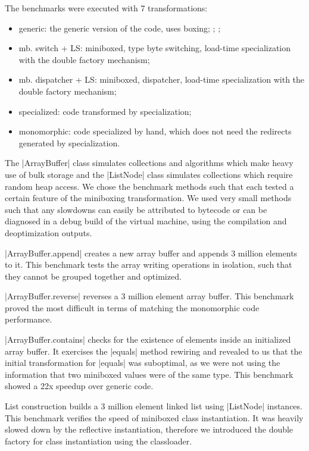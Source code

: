 The benchmarks were executed with 7 transformations:
\begin{itemize}
\item {generic}: the generic version of the code, uses boxing;
;
;
\item {mb. switch + LS}: miniboxed, type byte switching, load-time specialization with the double factory mechanism; 
\item {mb. dispatcher + LS}: miniboxed, dispatcher, load-time specialization with the double factory mechanism;
\item {specialized}: code transformed by specialization;
\item {monomorphic}: code specialized by hand, which does not need the redirects generated by specialization.
\end{itemize}


 The |ArrayBuffer| class simulates collections and algorithms which make heavy use of bulk storage and the |ListNode| class simulates collections which require random heap access. We chose the benchmark methods such that each tested a certain feature of the miniboxing transformation. We used very small methods such that any slowdowns can easily be attributed to bytecode or can be diagnosed in a debug build of the virtual machine, using the compilation and deoptimization outputs. 

|ArrayBuffer.append| creates a new array buffer and appends 3 million elements to it. This benchmark tests the array writing operations in isolation, such that they cannot be grouped together and optimized. 

|ArrayBuffer.reverse| reverses a 3 million element array buffer. This benchmark proved the most difficult in terms of matching the monomorphic code performance.

|ArrayBuffer.contains| checks for the existence of elements inside an initialized array buffer. It exercises the |equals| method rewiring and revealed to us that the initial transformation for |equals| was suboptimal, as we were not using the information that two miniboxed values were of the same type. This benchmark showed a 22x speedup over generic code. 

List construction builds a 3 million element linked list using |ListNode| instances. This benchmark verifies the speed of miniboxed class instantiation. It was heavily slowed down by the reflective instantiation, therefore we introduced the double factory for class instantiation using the classloader.

